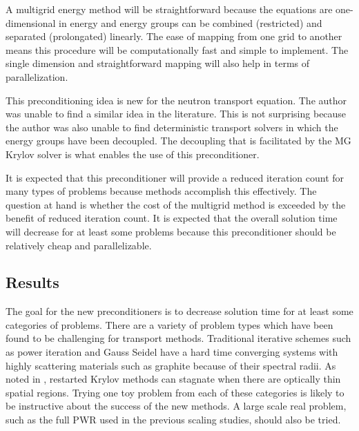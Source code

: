 A multigrid energy method will be straightforward because the equations are one-dimensional in energy and energy groups can be combined (restricted) and separated (prolongated) linearly. The ease of mapping from one grid to another means this procedure will be computationally fast and simple to implement. The single dimension and straightforward mapping will also help in terms of parallelization.  

This preconditioning idea is new for the neutron transport equation. The author was unable to find a similar idea in the literature. This is not surprising because the author was also unable to find deterministic transport solvers in which the energy groups have been decoupled. The decoupling that is facilitated by the MG Krylov solver is what enables the use of this preconditioner.

It is expected that this preconditioner will provide a reduced iteration count for many types of problems because \mg methods accomplish this effectively. The question at hand is whether the cost of the multigrid method is exceeded by the benefit of reduced iteration count. It is expected that the overall solution time will decrease for at least some problems because this preconditioner should be relatively cheap and parallelizable. 



\subsection{Results}
The goal for the new preconditioners is to decrease solution time for at least some categories of problems. There are a variety of problem types which have been found to be challenging for transport methods. Traditional iterative schemes such as power iteration and Gauss Seidel have a hard time converging systems with highly scattering materials such as graphite because of their spectral radii. As noted in \cite{Rosa2010}, restarted Krylov methods can stagnate when there are optically thin spatial regions. Trying one toy problem from each of these categories is likely to be instructive about the success of the new methods. A large scale real problem, such as the full PWR used in the previous scaling studies, should also be tried. 

